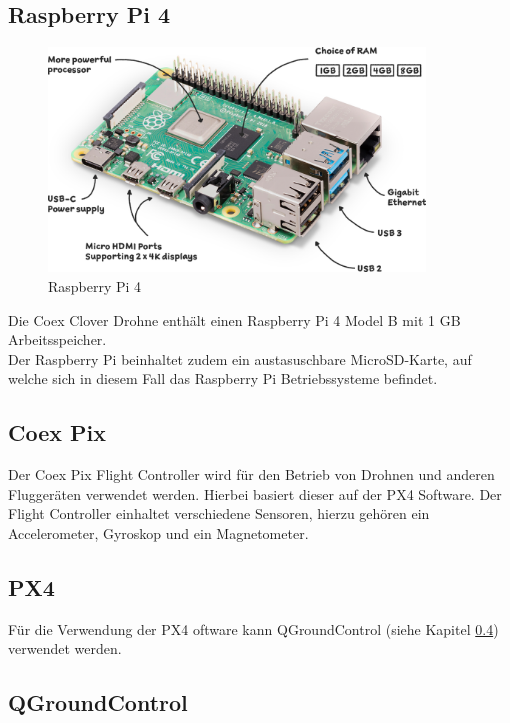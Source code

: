 \subsection{Raspberry Pi 4} \label{raspberry_pi:subsection}

\begin{figure}[htpb]
    \centering
    \includegraphics[width=10cm,keepaspectratio,angle=0]{images/raspberry-pi-4-labelled.png}
    \caption[Raspberry Pi 4]{\label{img raspberry_pi} Raspberry Pi 4 \cite{img_raspberry_pi}}
\end{figure}


Die Coex Clover Drohne enthält einen Raspberry Pi 4 Model B mit 1 GB Arbeitsspeicher.\\
Der Raspberry Pi beinhaltet zudem ein austasuschbare MicroSD-Karte, auf welche sich in diesem Fall das Raspberry Pi Betriebssysteme befindet.


\subsection{Coex Pix} \label{coex_pix:subsection}
Der Coex Pix Flight Controller wird für den Betrieb von Drohnen und anderen Fluggeräten verwendet werden. Hierbei basiert dieser auf der PX4 Software. Der Flight Controller einhaltet verschiedene Sensoren, hierzu gehören ein Accelerometer, Gyroskop und ein Magnetometer.


\subsection{PX4} \label{px4:subsection}
Für die Verwendung der PX4 oftware kann QGroundControl (siehe Kapitel \ref{qGroundControl:subsection}) verwendet werden. \cite[vgl.][]{px4} \\

\subsection{QGroundControl}  \label{qGroundControl:subsection}


